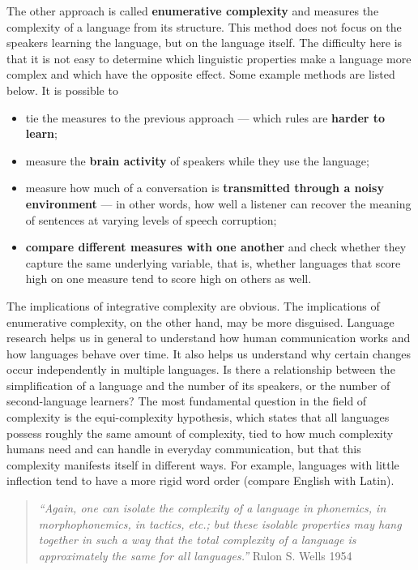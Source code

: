 The other approach is called \textbf{enumerative complexity} \parencite{Coltekin2022} and measures the complexity of a language from its structure. This method does not focus on the speakers learning the language, but on the language itself. The difficulty here is that it is not easy to determine which linguistic properties make a language more complex and which have the opposite effect. Some example methods are listed below. It is possible to
\begin{itemize}
    \item tie the measures to the previous approach --- which rules are \textbf{harder to learn};
    \item measure the \textbf{brain activity} of speakers while they use the language;
    \item measure how much of a conversation is \textbf{transmitted through a noisy environment} --- in other words, how well a listener can recover the meaning of sentences at varying levels of speech corruption;
    \item \textbf{compare different measures with one another} and check whether they capture the same underlying variable, that is, whether languages that score high on one measure tend to score high on others as well.
\end{itemize}

The implications of integrative complexity are obvious. The implications of enumerative complexity, on the other hand, may be more disguised. Language research helps us in general to understand how human communication works and how languages behave over time. It also helps us understand why certain changes occur independently in multiple languages. Is there a relationship between the simplification of a language and the number of its speakers, or the number of second-language learners?
The most fundamental question in the field of complexity is the equi-complexity hypothesis, which states that all languages possess roughly the same amount of complexity, tied to how much complexity humans need and can handle in everyday communication, but that this complexity manifests itself in different ways. For example, languages with little inflection tend to have a more rigid word order (compare English with Latin).

\begin{quote}
\textit{``Again, one can isolate the complexity of a language in phonemics, in morphophonemics, in tactics, etc.; but these isolable properties may hang together in such
a way that the total complexity of a language is approximately the same for all
languages.''} Rulon S. Wells 1954 \parencite{Newmeyer2022}
\end{quote}

